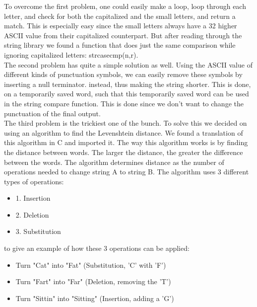 To overcome the first problem, one could easily make a loop, loop through each letter, and check for both the capitalized and the small letters,
and return a match. This is especially easy since the small letters always have a 32 higher ASCII value from their capitalized counterpart.
But after reading through the string library we found a function that does just the same comparison while ignoring capitalized letters: strcasecmp(n,r).
\\
The second problem has quite a simple solution as well. Using the ASCII value of different kinds of punctuation symbols, we can easily remove these symbols by inserting a null terminator. 
instead, thus making the string shorter. This is done, on a temporarily saved word, such that this temporarily saved word can be used in the string compare function. This is done since we don't want to change the punctuation of the final output.
\\
The third problem is the trickiest one of the bunch. To solve this we decided on using an algorithm to find the Levenshtein distance. 
We found a translation of this algorithm in C and imported it\cite{levenshtein}.
The way this algorithm works is by finding the distance between words. The larger the distance, the greater the difference between the words.
The algorithm determines distance as the number of operations needed to change string A to string B. The algorithm uses 3 different types of operations:
\begin{itemize}
  \item 1. Insertion
  \item 2. Deletion
  \item 3. Substitution
\end{itemize}

to give an example of how these 3 operations can be applied:
\begin{itemize}
  \item Turn "Cat" into "Fat"  (Substitution, 'C' with 'F')
  \item Turn "Fart" into "Far"  (Deletion, removing the 'T')
  \item Turn "Sittin" into "Sitting"  (Insertion, adding a 'G')
\end{itemize}

